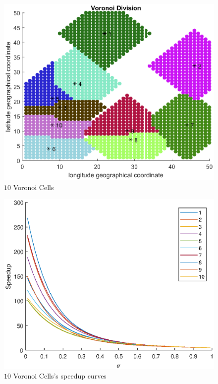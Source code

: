 \begin{figure}[!ht]
\centering
\includegraphics[width=1\columnwidth]{figure/voronoi_even_cells_save.eps}
\caption{$10$ Voronoi Cells}
\label{fig:voronoi_even_cells_save}
\end{figure}

\begin{figure}[!ht]
\centering
\includegraphics[width=1\columnwidth]{figure/voronoi_even_speedup_save.eps}
\caption{$10$ Voronoi Cells's speedup curves}
\label{fig:voronoi_even_speedup_save}
\end{figure}


